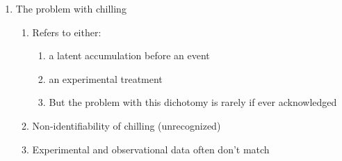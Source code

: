 \documentclass[11pt,letter]{article}
\begin{document}
\begin{enumerate}
\begin{enumerate}
\item Applied across a lot of fields and study systems ...
\begin{enumerate}
\item Satellite measures of greenup
\item Small scale cutting studies of forest tree species
\item Also, lots of similar work on crops
\item Molecular studies
\item Lots of models of it for forest trees and crops
\item Generally applies to leafing and flowering, with different fields focused on different events (much of molecular is flowers and vernalization, while forest trees and satellite is almost exclusively for leafout)
\end{enumerate}
\item Experimental context for it: things get chilled at 5\degree C (molecular and phenology people)
\item Models of it define it as what is needed for endodormancy break or leafout ...
\begin{enumerate}
\item Most common model is often sequential (explain it, include optimal chill idea)
\item But lots of variation, alternating, more complex versions of alternating (parallel etc.), whatever Luedeling is called. 
\end{enumerate}
\item And then there are attempts to estimate chilling using observational data in crops (but often when planted outside range) and forest trees ... and basically always based on assumptions from existing models and/or experiments (peaches again). 
\end{enumerate}
\item The problem with chilling
\begin{enumerate}
\item Refers to either:
\begin{enumerate}
\item a latent accumulation before an event
\item an experimental treatment
\item But the problem with this dichotomy is rarely if ever acknowledged
\end{enumerate}
\item Non-identifiability of chilling (unrecognized)
\item Experimental and observational data often don't match

\end{enumerate}
\end{enumerate}
\end{document}
